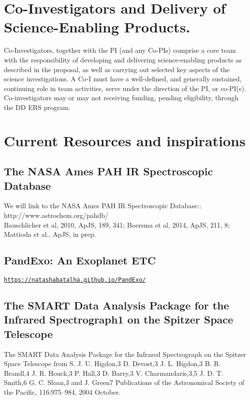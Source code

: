 \section*{Co-Investigators and Delivery of Science-Enabling Products.}
Co-Investigators, together with the PI (and any Co-PIs) comprise a core team with the responsibility of developing and delivering science-enabling products as described in the proposal, as well as carrying out selected key aspects of the science investigations.  A Co-I must have a well-defined, and generally sustained, continuing role in team activities, serve under the direction of the PI, or co-PI(s). Co-investigators may or may not receiving funding, pending eligibility, through the DD ERS program. 




\section*{Current Resources and inspirations}
\subsection*{The NASA Ames PAH IR Spectroscopic Database}
We will link to the NASA Ames PAH IR Spectroscopic Database:: \\
http://www.astrochem.org/pahdb/ \\
Bauschlicher et al, 2010, ApJS, 189, 341; Boersma et al, 2014, ApJS, 211, 8;  Mattioda et al., ApJS, in prep.\\

\subsection{PandExo: An Exoplanet ETC}
\href{https://natashabatalha.github.io/PandExo/}{\tt https://natashabatalha.github.io/PandExo/}

\subsection{The SMART Data Analysis Package for the Infrared Spectrograph1 on the Spitzer Space Telescope}
The SMART Data Analysis Package for the Infrared Spectrograph on the
Spitzer Space Telescope from S. J. U. Higdon,3 D. Devost,3
J. L. Higdon,3 B. R. Brandl,4 J. R. Houck,3 P. Hall,3 D. Barry,3
V. Charmandaris,3,5 J. D. T. Smith,6 G. C. Sloan,3 and J. Green7
Publications of the Astronomical Society of the Pacific, 116:975–984,
2004 October.


